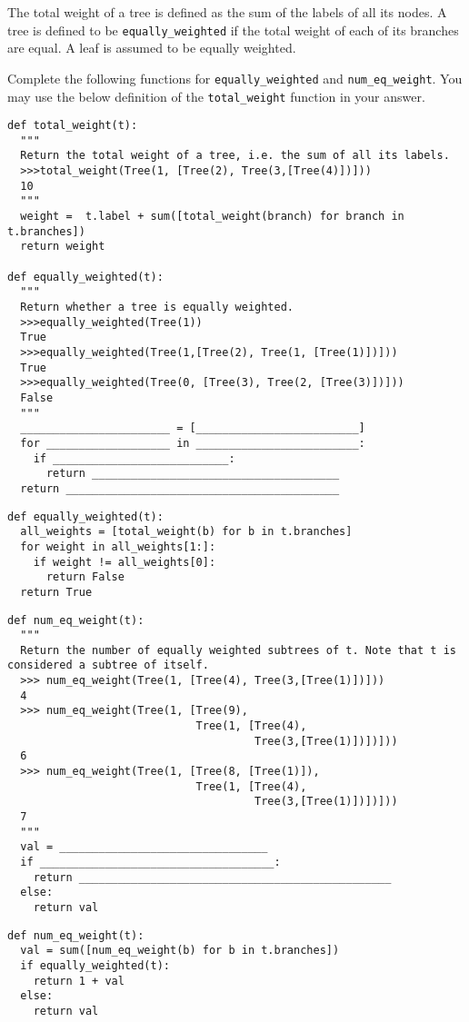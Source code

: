 \begin{blocksection}
\question The total weight of a tree is defined as the sum of the labels of all its nodes. A tree is defined to be \lstinline{equally_weighted} if the total weight of each of its branches are equal. A leaf is assumed to be equally weighted.

Complete the following functions for \lstinline{equally_weighted} and \lstinline{num_eq_weight}. You may use the below definition of the \lstinline{total_weight} function in your answer.

\begin{lstlisting}
def total_weight(t):
  """
  Return the total weight of a tree, i.e. the sum of all its labels.
  >>>total_weight(Tree(1, [Tree(2), Tree(3,[Tree(4)])]))
  10
  """
  weight =  t.label + sum([total_weight(branch) for branch in t.branches])
  return weight
    
def equally_weighted(t):
  """
  Return whether a tree is equally weighted.
  >>>equally_weighted(Tree(1))
  True
  >>>equally_weighted(Tree(1,[Tree(2), Tree(1, [Tree(1)])]))
  True
  >>>equally_weighted(Tree(0, [Tree(3), Tree(2, [Tree(3)])]))
  False
  """
  _______________________ = [_________________________]
  for ___________________ in _________________________:
    if ___________________________:
      return ______________________________________
  return __________________________________________
\end{lstlisting}

\begin{solution}
\begin{lstlisting}
def equally_weighted(t):
  all_weights = [total_weight(b) for b in t.branches]
  for weight in all_weights[1:]:
    if weight != all_weights[0]:
      return False
  return True
\end{lstlisting}
\end{solution}
\end{blocksection}

\begin{blocksection}
\begin{lstlisting}
def num_eq_weight(t):
  """
  Return the number of equally weighted subtrees of t. Note that t is considered a subtree of itself.
  >>> num_eq_weight(Tree(1, [Tree(4), Tree(3,[Tree(1)])]))
  4
  >>> num_eq_weight(Tree(1, [Tree(9), 
                             Tree(1, [Tree(4), 
                                      Tree(3,[Tree(1)])])]))
  6
  >>> num_eq_weight(Tree(1, [Tree(8, [Tree(1)]), 
                             Tree(1, [Tree(4), 
                                      Tree(3,[Tree(1)])])]))
  7
  """
  val = ________________________________ 
  if ____________________________________:
    return ________________________________________________
  else:
    return val
\end{lstlisting}

\begin{solution}
\begin{lstlisting}
def num_eq_weight(t):
  val = sum([num_eq_weight(b) for b in t.branches])
  if equally_weighted(t):
    return 1 + val
  else:
    return val
\end{lstlisting}
\end{solution}
\end{blocksection}